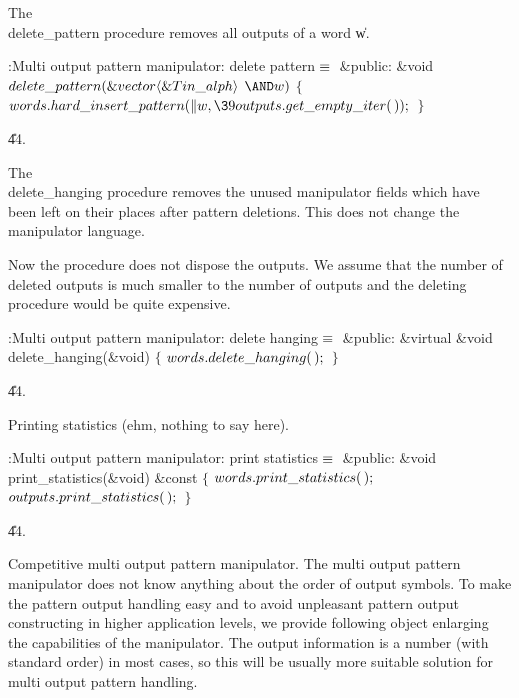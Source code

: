 The \\{delete\_pattern} procedure removes all outputs of a word \|w.

\Y\B\4:Multi output pattern manipulator: delete pattern\X${}\equiv{}$\6
\4\&{public}:\6
\&{void} ${}\\{delete\_pattern}(\&{vector}\langle\&{Tin\_alph}\rangle{}$ ${}{%
\AND}\|w){}$\1\1\2\2\6
${}\{{}$\1\6
${}\\{words}.\\{hard\_insert\_pattern}(\|w,\39\\{outputs}.\\{get\_empty\_iter}(%
\,));{}$\6
\4${}\}{}$\2\par
\U44.\fi

The \\{delete\_hanging} procedure removes the unused manipulator fields
which have been left on their places after pattern deletions. This does
not change the manipulator language.

Now the procedure does not dispose the outputs. We assume that the
number of deleted outputs is much smaller to the number of outputs and
the deleting procedure would be quite expensive.

\Y\B\4:Multi output pattern manipulator: delete hanging\X${}\equiv{}$\6
\4\&{public}:\6
\&{virtual} \&{void} \\{delete\_hanging}(\&{void})\1\1\2\2\6
${}\{{}$\1\6
${}\\{words}.\\{delete\_hanging}(\,);{}$\6
\4${}\}{}$\2\par
\U44.\fi

Printing statistics (ehm, nothing to say here).

\Y\B\4:Multi output pattern manipulator: print statistics\X${}\equiv{}$\6
\4\&{public}:\6
\&{void} \\{print\_statistics}(\&{void}) \&{const}\1\1\2\2\6
${}\{{}$\1\6
${}\\{words}.\\{print\_statistics}(\,);{}$\6
${}\\{outputs}.\\{print\_statistics}(\,);{}$\6
\4${}\}{}$\2\par
\U44.\fi

Competitive multi output pattern manipulator. The multi output
pattern manipulator does not know anything about the order of output
symbols. To make the pattern output handling easy and to avoid
unpleasant pattern output constructing in higher application levels, we
provide following object enlarging the capabilities of the manipulator.
The output information is a number (with standard order) in most cases,
so this will be usually more suitable solution for multi output pattern
handling.

